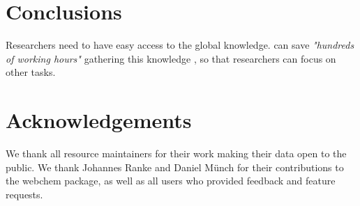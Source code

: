 \documentclass[article, shortnames]{jss}\usepackage[]{graphicx}\usepackage[]{color}
\begin{document}
\section[Conclusions]{Conclusions}
Researchers need to have easy access to the global knowledge.
 can save \emph{"hundreds of working hours"} gathering this knowledge \citep{Munch_Galizia_2016}, so that researchers can focus on other tasks.


\section*{Acknowledgements}
We thank all resource maintainers for their work making their data open to the public.
We thank Johannes Ranke and Daniel Münch for their contributions to the webchem package, as well as all users who provided feedback and feature requests.



\end{document}
